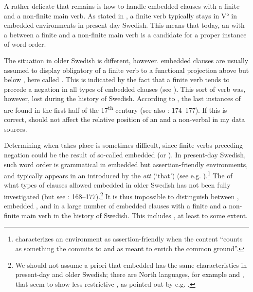 \documentclass[output=paper, colorlinks, citecolor=brown]{langscibook}
\begin{document}
A rather delicate  that remains is how to handle embedded clauses with a finite  and a non-finite main verb. As stated in , a finite verb typically stays in V° in embedded environments in present-day Swedish. This means that today, an  with a  between a finite  and a non-finite main verb is a candidate for a proper instance of  word order.


The situation in older Swedish is different, however.  embedded clauses are usually assumed to display obligatory  of a finite verb to a functional projection above  but below , here called . This is indicated by the fact that a finite verb tends to precede a negation in all types of embedded clauses (see \citealt{Platzack1988emergence,Falk1993,Hakansson2013}). This sort of verb  was, however, lost during the history of Swedish. According to \citet{Platzack1988emergence}, the last instances of   are found in the first half of the 17\textsuperscript{th} century (see also \citealt{Falk1993}: 174–177). If this is correct,  should not affect the relative position of an  and a non-verbal  in my data sources.



Determining when  takes place is sometimes difficult, since finite verbs preceding negation could be the result of so-called embedded  (or ). In present-day Swedish, such  word order is grammatical in embedded but assertion-friendly environments, and typically appears in an  introduced by the  \textit{att} (‘that’) (see e.g. \citealt{Petersson2014}).\footnote{\citet[4]{Gartner2016} characterizes an environment as assertion-friendly when the content “counts as something the  commits to and as meant to enrich the common ground”.} The  of what types of clauses allowed embedded  in older Swedish has not been fully investigated (but see \citealt{Falk1993}: 168–177).\footnote{We should not assume a priori that embedded  has the same characteristics in present-day and older Swedish; there are North  languages, for example  and , that seem to show less restrictive , as pointed out by e.g. \citet{Gartner2016}.} It is thus impossible to distinguish between , embedded , and  in a large number of embedded clauses with a finite  and a non-finite main verb in the history of Swedish. This includes , at least to some extent.
\end{document}
